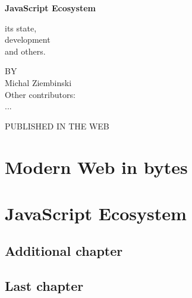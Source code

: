 \documentclass[a4paper,11pt]{book}
\begin{document}

\frontmatter
% 
\clearpage

\pagestyle{empty}
\begin{center}
\bfseries
\nbvspace[1]
\Huge
{\nbtitlestretch\huge
JavaScript Ecosystem}

\nbvspace[1]
\normalsize

its state,\\
development\\
and others.

\nbvspace[1]

\small BY\\
\Large Michal Ziembinski\\[0.5em]
\footnotesize Other contributors: \\
...

\nbvspace[2]

\nbvspace[3]
\normalsize

\large
PUBLISHED IN THE WEB
\nbvspace[1]
\end{center}

\thispagestyle{empty}
% 
\tableofcontents
% 
\mainmatter

\chapter{Modern Web in bytes}



\chapter{JavaScript Ecosystem}

%
%
%


\section{Additional chapter}
%
 
\section{Last chapter}
%
 
\backmatter
 
 


\end{document}
